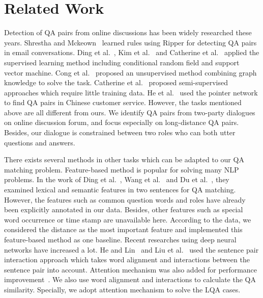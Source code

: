 \section{Related Work}
\label{sec:relatedwork}


 
Detection of QA pairs from online discussions has been widely researched these years. Shrestha and Mckeown~\cite{shrestha2004detection} learned rules using Ripper for detecting QA pairs in email conversations. Ding et al.~\cite{ding2008using}, Kim et al.~\cite{kim2010tagging} and Catherine et al.~\cite{catherine2012does} applied the supervised learning method including conditional random field and support vector machine. Cong et al.~\cite{cong2008finding} proposed an unsupervised method combining graph knowledge to solve the task. Catherine et al.~\cite{catherine2013semi} proposed semi-supervised approaches which require little training data. He et al.~\cite{he2019learning} used the pointer network to find QA pairs in Chinese customer service. 
However, the tasks mentioned above are all different from ours. 
We identify QA pairs from two-party dialogues on online discussion forum, 
and focus especially on long-distance QA pairs. Besides, our 
dialogue is constrained between two roles who can both utter questions and  answers.

There exists several methods in other tasks which can be adapted to 
our QA matching problem. Feature-based method is popular for solving 
many NLP problems. In the work of Ding et al.~\cite{ding2008using}, 
Wang et al.~\cite{wang2010modeling} and 
Du et al.~\cite{du2017discovering}, 
they examined lexical and semantic features in two sentences 
for QA matching. However, the features such as common question words 
and roles have already been explicitly annotated in our data. 
Besides, other features such as special word occurrence or time stamp are 
unavailable here. According to the data, we considered the distance as 
the most important feature and implemented this feature-based method as one 
baseline. Recent researches using deep neural networks have increased a lot. 
He and Lin~\cite{he2016pairwise} and 
Liu et al.~\cite{liu2016modelling} used the sentence pair interaction 
approach which takes word alignment and interactions between the sentence 
pair into account. Attention mechanism was also added for performance 
improvement~\cite{rocktaschel2015reasoning,wang2016learning,chen2017enhanced}. 
We also use word alignment and interactions to calculate the QA similarity. 
Specially, we adopt attention mechanism to solve the LQA cases.

